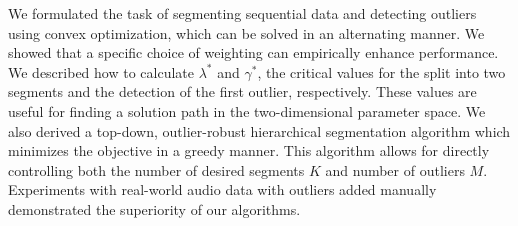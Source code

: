 
We formulated the task of segmenting sequential data and detecting outliers using convex optimization, which can be solved in an alternating manner. We showed that a specific choice of weighting
can empirically enhance performance.
We described how to calculate
$\lambda^*$ and $\gamma^*$, the critical values for the split into two
segments and the detection of the first outlier, respectively. These
values are useful for finding a solution path in the two-dimensional
parameter space. We also derived a top-down, outlier-robust
hierarchical segmentation algorithm which minimizes the objective in a
greedy manner.
%
This algorithm allows for directly controlling both the
number of desired segments $K$ and number of outliers $M$. Experiments with %
real-world audio data with outliers added manually demonstrated the superiority of our algorithms.

